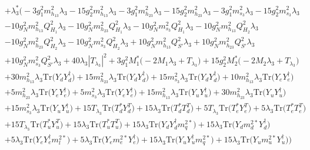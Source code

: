 {\begin{align}
 &+\lambda_3^* \Big(-3 g_{1}^{2} m_{h_{13}}^2 \lambda_3 -15 g_{2}^{2} m_{h_{13}}^2 \lambda_3 -3 g_{1}^{2} m_{h_{23}}^2 \lambda_3 -15 g_{2}^{2} m_{h_{23}}^2 \lambda_3 -3 g_{1}^{2} m_{s_3}^2 \lambda_3 -15 g_{2}^{2} m_{s_3}^2 \lambda_3 \nonumber \\ 
 &-10 g_{N}^{2} m_{h_{13}}^2 Q_{H_1}^{2} \lambda_3 -10 g_{N}^{2} m_{h_{23}}^2 Q_{H_1}^{2} \lambda_3 -10 g_{N}^{2} m_{s_3}^2 Q_{H_1}^{2} \lambda_3 -10 g_{N}^{2} m_{h_{13}}^2 Q_{H_2}^{2} \lambda_3 \nonumber \\ 
 &-10 g_{N}^{2} m_{h_{23}}^2 Q_{H_2}^{2} \lambda_3 -10 g_{N}^{2} m_{s_3}^2 Q_{H_2}^{2} \lambda_3 +10 g_{N}^{2} m_{h_{13}}^2 Q_{S'}^{2} \lambda_3 +10 g_{N}^{2} m_{h_{23}}^2 Q_{S'}^{2} \lambda_3 \nonumber \\ 
 &+10 g_{N}^{2} m_{s_3}^2 Q_{S'}^{2} \lambda_3 +40 \lambda_3 |T_{\lambda_3}|^2 +3 g_{1}^{2} M_1^* \Big(-2 M_1 \lambda_3  + T_{\lambda_3}\Big)+15 g_{2}^{2} M_2^* \Big(-2 M_2 \lambda_3  + T_{\lambda_3}\Big)\nonumber \\ 
 &+30 m_{h_{13}}^2 \lambda_3 \mbox{Tr}\Big({Y_d  Y_{d}^{\dagger}}\Big) +15 m_{h_{23}}^2 \lambda_3 \mbox{Tr}\Big({Y_d  Y_{d}^{\dagger}}\Big) +15 m_{s_3}^2 \lambda_3 \mbox{Tr}\Big({Y_d  Y_{d}^{\dagger}}\Big) +10 m_{h_{13}}^2 \lambda_3 \mbox{Tr}\Big({Y_e  Y_{e}^{\dagger}}\Big) \nonumber \\ 
 &+5 m_{h_{23}}^2 \lambda_3 \mbox{Tr}\Big({Y_e  Y_{e}^{\dagger}}\Big) +5 m_{s_3}^2 \lambda_3 \mbox{Tr}\Big({Y_e  Y_{e}^{\dagger}}\Big) +15 m_{h_{13}}^2 \lambda_3 \mbox{Tr}\Big({Y_u  Y_{u}^{\dagger}}\Big) +30 m_{h_{23}}^2 \lambda_3 \mbox{Tr}\Big({Y_u  Y_{u}^{\dagger}}\Big) \nonumber \\ 
 &+15 m_{s_3}^2 \lambda_3 \mbox{Tr}\Big({Y_u  Y_{u}^{\dagger}}\Big) +15 T_{\lambda_3} \mbox{Tr}\Big({T_d^*  Y_{d}^{T}}\Big) +15 \lambda_3 \mbox{Tr}\Big({T_d^*  T_{d}^{T}}\Big) +5 T_{\lambda_3} \mbox{Tr}\Big({T_e^*  Y_{e}^{T}}\Big) +5 \lambda_3 \mbox{Tr}\Big({T_e^*  T_{e}^{T}}\Big) \nonumber \\ 
 &+15 T_{\lambda_3} \mbox{Tr}\Big({T_u^*  Y_{u}^{T}}\Big) +15 \lambda_3 \mbox{Tr}\Big({T_u^*  T_{u}^{T}}\Big) +15 \lambda_3 \mbox{Tr}\Big({Y_d  Y_{d}^{\dagger}  m_q^{2 *}}\Big) +15 \lambda_3 \mbox{Tr}\Big({Y_d  m_d^{2 *}  Y_{d}^{\dagger}}\Big) \nonumber \\ 
 &+5 \lambda_3 \mbox{Tr}\Big({Y_e  Y_{e}^{\dagger}  m_l^{2 *}}\Big) +5 \lambda_3 \mbox{Tr}\Big({Y_e  m_e^{2 *}  Y_{e}^{\dagger}}\Big) +15 \lambda_3 \mbox{Tr}\Big({Y_u  Y_{u}^{\dagger}  m_q^{2 *}}\Big) +15 \lambda_3 \mbox{Tr}\Big({Y_u  m_u^{2 *}  Y_{u}^{\dagger}}\Big) \Big)\nonumber \\ 

\end{align}}
